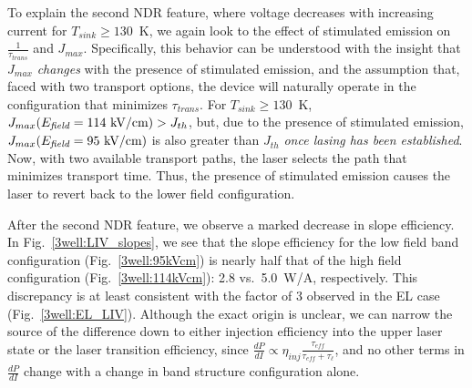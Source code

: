 To explain the second NDR feature, where voltage decreases with increasing current for $T_\textit{sink}\geq130$~K, we again look to the effect of stimulated emission on $\frac{1}{\tau_\textit{trans}}$ and $J_{max}$.  Specifically, this behavior can be understood with the insight that $J_{max}$ \emph{changes} with the presence of stimulated emission, and the assumption that, faced with two transport options, the device will naturally operate in the configuration that minimizes $\tau_\textit{trans}$.  For $T_\textit{sink}\geq130$~K, $J_{max}(E_\textit{field}=114~\textnormal{kV/cm})>J_{th}$, but, due to the presence of stimulated emission, $J_{max}(E_\textit{field}=95~\textnormal{kV/cm})$ is also greater than $J_{th}$ \emph{once lasing has been established}.  Now, with two available transport paths, the laser selects the path that minimizes transport time.  %
Thus, the presence of stimulated emission causes the laser to revert back to the lower field configuration.%


After the second NDR feature, we observe a marked decrease in slope efficiency.  In Fig.~\ref{3well:LIV_slopes}, we see that the slope efficiency for the low field band configuration (Fig.~\ref{3well:95kVcm}) is nearly half that of the high field configuration (Fig.~\ref{3well:114kVcm}): 2.8 vs.\ 5.0~W/A, respectively.  This discrepancy is at least consistent with the factor of 3 observed in the EL case (Fig.~\ref{3well:EL_LIV}).  Although the exact origin is unclear, we can narrow the source of the difference down to either injection efficiency into the upper laser state or the laser transition efficiency, since $\frac{d P}{dI}\propto \eta_\textit{inj} \frac{\tau_\textit{eff}}{\tau_\textit{eff}+\tau_{\ell}}$, and no other terms in $\frac{d P}{dI}$ change with a change in band structure configuration alone.


